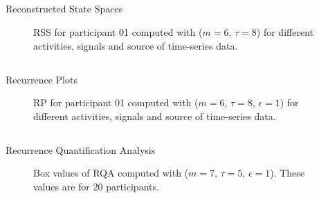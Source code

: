 \subsection{}
{
\begin{frame}{Reconstructed State Spaces}
    \begin{figure}
	\caption{RSS for participant 01 computed with ($m=6$, $\tau=8$)
	for different activities, signals and source of time-series data.
	} 
   \end{figure}
\end{frame}
}





\subsection{}
{
\begin{frame}{Recurrence Plots}
    \begin{figure}
	\caption{RP for participant 01 computed 
	with ($m=6$, $\tau=8$, $\epsilon=1$)
	for different activities, signals and source of time-series data.
	} 
   \end{figure}
	
\end{frame}
}




\subsection{}
{

\begin{frame}{Recurrence Quantification Analysis}
    \begin{figure}
	\caption{Box values of  RQA computed with 
	($m=7$, $\tau=5$, $\epsilon=1$). 
	These values are for 20 participants.
} 
   \end{figure}
	
\end{frame}
}



